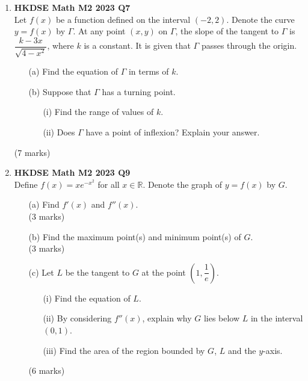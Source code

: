\documentclass{report}
\begin{document}
\begin{enumerate}
	\item \textbf{HKDSE Math M2 2023 Q7}\\
	Let $f(x)$ be a function defined on the interval $(-2,2)$. Denote the curve $y = f(x)$ by $\Gamma$. At any point $(x,y)$ on $\Gamma$, the slope of the tangent to $\Gamma$ is $\dfrac{k - 3x}{\sqrt{4-x^2}}$, where $k$ is a constant. It is given that $\Gamma$ passes through the origin.
	\begin{enumerate}
		\item [(a)]Find the equation of $\Gamma$ in terms of $k$.
		\item [(b)]Suppose that $\Gamma$ has a turning point.
		\begin{enumerate}
			\item [(i)]Find the range of values of $k$.
			\item [(ii)]Does $\Gamma$ have a point of inflexion? Explain your answer.
		\end{enumerate}
	\end{enumerate}
	(7 marks)

	\item \textbf{HKDSE Math M2 2023 Q9}\\
	Define $ f(x) = xe^{-x^2}$ for all $x\in \mathbb{R}$. Denote the graph of $y = f(x)$ by $G$.
	\begin{enumerate}
		\item [(a)]Find $f'(x)$ and $f''(x)$. \\(3 marks)
		\item [(b)]Find the maximum point(s) and minimum point(s) of $G$. \\(3 marks)
		\item [(c)]Let $L$ be the tangent to $G$ at the point $\left(1,\dfrac{1}{e}\right)$.
		\begin{enumerate}
			\item [(i)]Find the equation of $L$.
			\item [(ii)]By considering $f''(x)$, explain why $G$ lies below $L$ in the interval $(0,1)$.
			\item [(iii)]Find the area of the region bounded by $G$, $L$ and the $y$-axis.
		\end{enumerate}
		(6 marks)
	\end{enumerate}
\end{enumerate}
\end{document}

